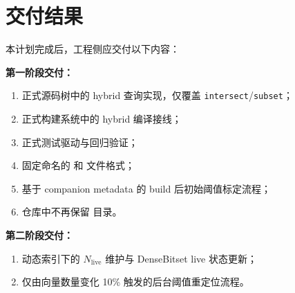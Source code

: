 \documentclass[UTF8]{ctexart}
\begin{document}
\section{交付结果}
本计划完成后，工程侧应交付以下内容：

\textbf{第一阶段交付：}

\begin{enumerate}
\item 正式源码树中的 hybrid 查询实现，仅覆盖 \texttt{intersect}/\texttt{subset}；
\item 正式构建系统中的 hybrid 编译接线；
\item 正式测试驱动与回归验证；
\item 固定命名的  和  文件格式；
\item 基于 companion metadata 的 build 后初始阈值标定流程；
\item 仓库中不再保留  目录。
\end{enumerate}

\textbf{第二阶段交付：}

\begin{enumerate}
\item 动态索引下的 \(N_{\text{live}}\) 维护与 DenseBitset live 状态更新；
\item 仅由向量数量变化 10\% 触发的后台阈值重定位流程。
\end{enumerate}
\end{document}
